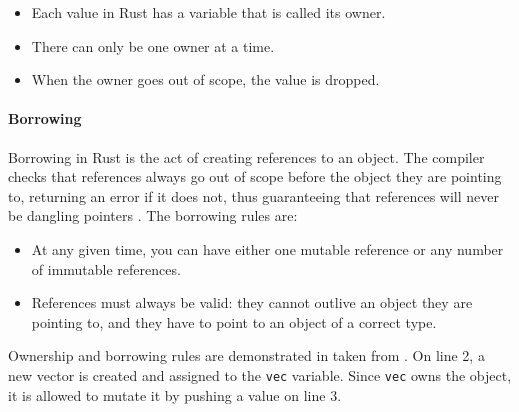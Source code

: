 \begin{itemize}
    \item Each value in Rust has a variable that is called its owner.
    \item There can only be one owner at a time.
    \item When the owner goes out of scope, the value is dropped.
\end{itemize}

\paragraph{Borrowing}
Borrowing in Rust is the act of creating references to an object. The compiler checks that references always go out of scope before the object they are pointing to, returning an error if it does not, thus guaranteeing that references will never be dangling pointers \cite{reed-patina}. The borrowing rules are:

\begin{itemize}
    \item At any given time, you can have either one mutable reference or any number of immutable references.
    \item References must always be valid: they cannot outlive an object they are pointing to, and they have to point to an object of a correct type.
\end{itemize}

Ownership and borrowing rules are demonstrated in  taken from \cite{linus-parallelization}. On line 2, a new vector is created and assigned to the \texttt{vec} variable. Since \texttt{vec} owns the object, it is allowed to mutate it by pushing a value on line 3.


